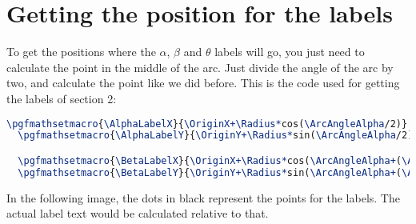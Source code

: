 \documentclass{amsart}
\begin{document}
\newpage

\section{Getting the position for the labels}

To get the positions where the $\alpha$, $\beta$ and $\theta$ labels will go,
you just need to calculate the point in the middle of the arc. Just divide the
angle of the arc by two, and calculate the point like we did before. This is the
code used for getting the labels of section 2:

\begin{lstlisting}[language=tex]
  \pgfmathsetmacro{\AlphaLabelX}{\OriginX+\Radius*cos(\ArcAngleAlpha/2)}
  \pgfmathsetmacro{\AlphaLabelY}{\OriginY+\Radius*sin(\ArcAngleAlpha/2)}

  \pgfmathsetmacro{\BetaLabelX}{\OriginX+\Radius*cos(\ArcAngleAlpha+(\ArcAngleBeta/2))}
  \pgfmathsetmacro{\BetaLabelY}{\OriginY+\Radius*sin(\ArcAngleAlpha+(\ArcAngleBeta/2))}
\end{lstlisting}

In the following image, the dots in black represent the points for the
labels. The actual label text would be calculated relative to that.
\end{document}
